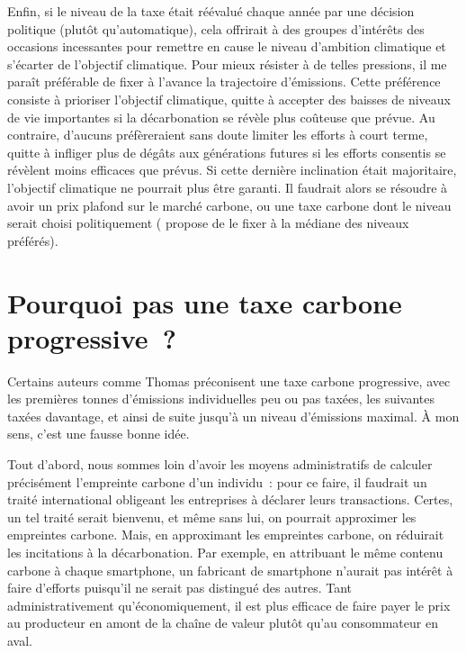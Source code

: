 \documentclass[a5paper,french]{memoir}
\begin{document}
Enfin, si le niveau de la taxe était réévalué chaque année par une décision politique (plutôt qu'automatique), cela offrirait à des groupes d'intérêts des occasions incessantes pour remettre en cause le niveau d'ambition climatique et s'écarter de l'objectif climatique. Pour mieux résister à de telles pressions, il me paraît préférable de fixer à l'avance la trajectoire d'émissions. Cette préférence consiste à prioriser l'objectif climatique, quitte à accepter des baisses de niveaux de vie importantes si la décarbonation se révèle plus coûteuse que prévue. 
Au contraire, d'aucuns préfèreraient sans doute limiter les efforts à court terme, quitte à infliger plus de dégâts aux générations futures si les efforts consentis se révèlent moins efficaces que prévus. Si cette dernière inclination était majoritaire, l'objectif climatique ne pourrait plus être garanti. Il faudrait alors se résoudre à avoir un prix plafond sur le marché carbone, ou une taxe carbone dont le niveau serait choisi politiquement (\cite{weitzman_world_2017} propose de le fixer à la médiane des niveaux préférés). 

\section*{\normalsize Pourquoi pas une taxe carbone progressive~?}\label{q:taxe_progressive}

Certains auteurs comme Thomas \cite{piketty_capital_2019} préconisent une taxe carbone progressive, avec les premières tonnes d'émissions individuelles peu ou pas taxées, les suivantes taxées davantage, et ainsi de suite jusqu'à un niveau d'émissions maximal. À mon sens, c'est une fausse bonne idée. 

Tout d'abord, nous sommes loin d'avoir les moyens administratifs de calculer précisément l'empreinte carbone d'un individu~: pour ce faire, il faudrait un traité international obligeant les entreprises à déclarer leurs transactions. Certes, un tel traité serait bienvenu, et même sans lui, on pourrait approximer les empreintes carbone. Mais, en approximant les empreintes carbone, on réduirait les incitations à la décarbonation. Par exemple, en attribuant le même contenu carbone à chaque smartphone, un fabricant de smartphone n'aurait pas intérêt à faire d'efforts puisqu'il ne serait pas distingué des autres. Tant administrativement qu'économiquement, il est plus efficace de faire payer le prix au producteur en amont de la chaîne de valeur plutôt qu'au consommateur en aval. 
\end{document}
